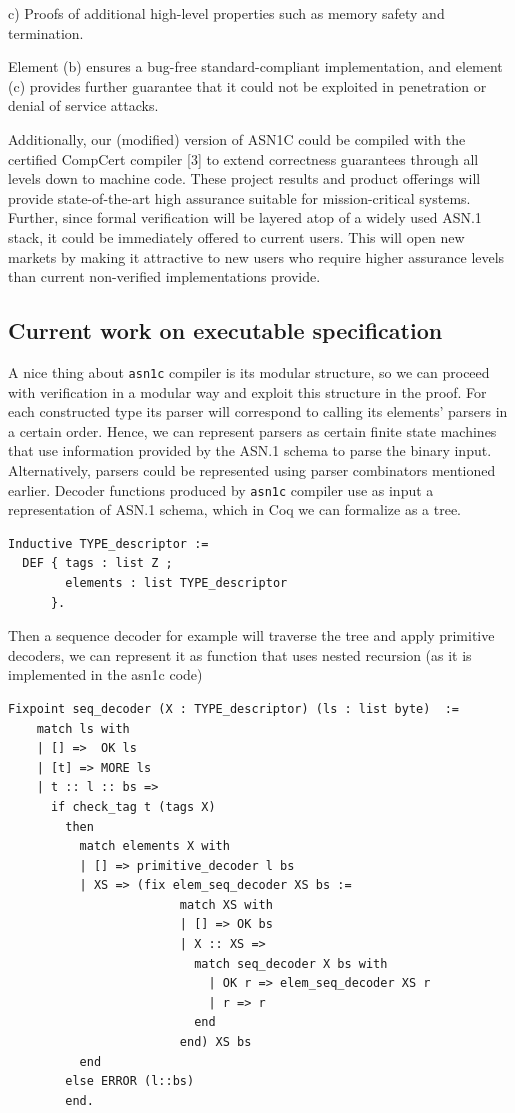 \documentclass[acmsmall,nonacm]{acmart}
\begin{document}
c) Proofs of additional high-level properties such as memory safety and termination. 

Element (b) ensures a bug-free standard-compliant implementation, and element (c) provides further guarantee that it could not be exploited in penetration or denial of service attacks.

Additionally, our (modified) version of ASN1C could be compiled with the certified CompCert compiler [3] to extend correctness guarantees through all levels down to machine code. These project results and product offerings will provide state-of-the-art high assurance suitable for mission-critical systems. Further, since formal verification will be layered atop of a widely used ASN.1 stack, it could be immediately offered to current users. This will open new markets by making it attractive to new users who require higher assurance levels than current non-verified implementations provide.

\subsection{Current work on executable specification}

A nice thing about \texttt{asn1c} compiler is its modular structure, so we can proceed with verification in a modular way and exploit this structure in the proof. For each constructed type its parser will correspond to calling its elements' parsers in a certain order. Hence, we can represent parsers as certain finite state machines that use information provided by the ASN.1 schema to parse the binary input. Alternatively, parsers could be represented using parser combinators mentioned earlier. Decoder functions produced by \texttt{asn1c} compiler use as input a representation of ASN.1 schema, which in Coq we can formalize as a tree.

 \begin{lstlisting}[language=Coq]
Inductive TYPE_descriptor :=
  DEF { tags : list Z ;
        elements : list TYPE_descriptor 
      }.
 \end{lstlisting}

Then a sequence decoder for example will traverse the tree and apply primitive decoders, we can represent it as function that uses nested recursion (as it is implemented in the asn1c code)
 
 \begin{lstlisting}[language=Coq]
 Fixpoint seq_decoder (X : TYPE_descriptor) (ls : list byte)  :=
    match ls with
    | [] =>  OK ls
    | [t] => MORE ls       
    | t :: l :: bs =>          
      if check_tag t (tags X)
        then
          match elements X with 
          | [] => primitive_decoder l bs 
          | XS => (fix elem_seq_decoder XS bs :=
                        match XS with
                        | [] => OK bs
                        | X :: XS =>
                          match seq_decoder X bs with
                            | OK r => elem_seq_decoder XS r 
                            | r => r
                          end
                        end) XS bs
          end
        else ERROR (l::bs)
        end.
 \end{lstlisting}
\end{document}
